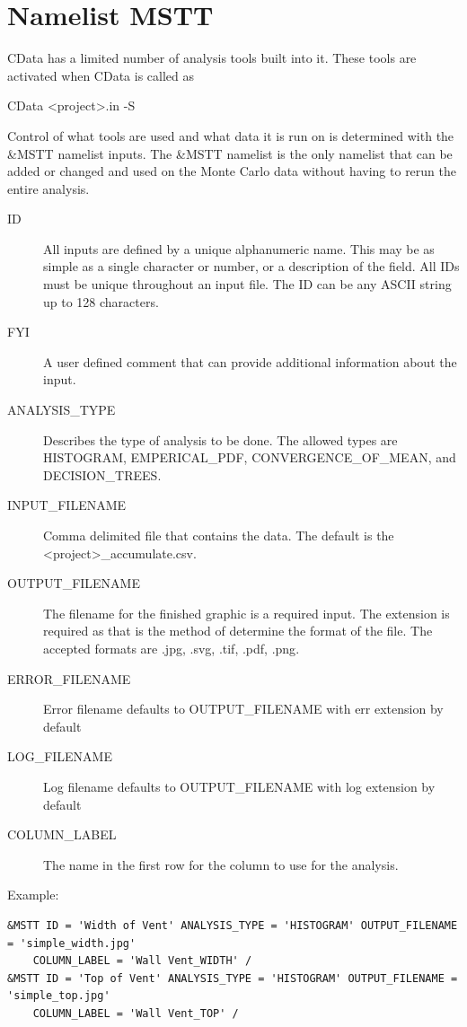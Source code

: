 \documentclass[12pt,twoside]{book}
\begin{document}
\section{Namelist MSTT}
\label{info:MSTT}

CData has a limited number of analysis tools built into it. These tools are activated when CData is called as

{\ct CData <project>.in -S}

Control of what tools are used and what data it is run on is determined with the {\ct \&MSTT} namelist inputs. The {\ct \&MSTT} namelist is the only namelist that can be added or changed and used on the Monte Carlo data without having to rerun the entire analysis.


\begin{description}
 \item[ID] All inputs are defined by a unique alphanumeric name. This may be as simple as a single character or number, or a description of the field. All IDs must be unique throughout an input file. The { \ct ID} can be any ASCII string up to 128 characters.
  \item[FYI] A user defined comment that can provide additional information about the input.
 \item[ANALYSIS\_TYPE] Describes the type of analysis to be done. The allowed types are {\ct HISTOGRAM}, {\ct EMPERICAL\_PDF}, {\ct CONVERGENCE\_OF\_MEAN}, and {\ct DECISION\_TREES}.
 \item[INPUT\_FILENAME] Comma delimited file that contains the data. The default is the \\
     {\ct <project>\_accumulate.csv}.
 \item[OUTPUT\_FILENAME] The filename for the finished graphic is a required input. The extension is required as that is the method of determine the format of the file. The accepted formats are {\ct *.jpg}, {\ct *.svg}, {\ct *.tif}, {\ct *.pdf}, {\ct *.png}.
 \item[ERROR\_FILENAME] Error filename defaults to {\ct OUTPUT\_FILENAME} with {\ct err} extension by default
 \item[LOG\_FILENAME] Log filename defaults to {\ct OUTPUT\_FILENAME} with {\ct log} extension by default
 \item[COLUMN\_LABEL] The name in the first row for the column to use for the analysis.
\end{description}

\vspace{\baselineskip}
\noindent Example:
\begin{lstlisting}[language=cdata, basicstyle=\scriptsize]
&MSTT ID = 'Width of Vent' ANALYSIS_TYPE = 'HISTOGRAM' OUTPUT_FILENAME = 'simple_width.jpg'
    COLUMN_LABEL = 'Wall Vent_WIDTH' /
&MSTT ID = 'Top of Vent' ANALYSIS_TYPE = 'HISTOGRAM' OUTPUT_FILENAME = 'simple_top.jpg'
    COLUMN_LABEL = 'Wall Vent_TOP' /
\end{lstlisting}
\end{document}
